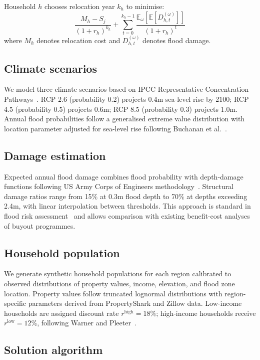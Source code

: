 \documentclass[11pt,letterpaper]{article}
\theoremstyle{definition}
\newcommand{\E}{\mathbb{E}}
\begin{document}
Household $h$ chooses relocation year $k_h$ to minimise:
\begin{equation}
\frac{M_h - S_j}{(1+r_h)^{k_h}} + \sum_{t=0}^{k_h-1} \frac{\E_\omega[\E[D_{h,t}^{(\omega)}]]}{(1+r_h)^t}
\end{equation}
where $M_h$ denotes relocation cost and $D_{h,t}^{(\omega)}$ denotes flood damage.

\subsection*{Climate scenarios}

We model three climate scenarios based on IPCC Representative Concentration Pathways~\cite{ipcc2019srocc}. RCP 2.6 (probability 0.2) projects 0.4m sea-level rise by 2100; RCP 4.5 (probability 0.5) projects 0.6m; RCP 8.5 (probability 0.3) projects 1.0m. Annual flood probabilities follow a generalised extreme value distribution with location parameter adjusted for sea-level rise following Buchanan et al.~\cite{buchanan2016allowances}.

\subsection*{Damage estimation}

Expected annual flood damage combines flood probability with depth-damage functions following US Army Corps of Engineers methodology~\cite{usace1992depth}. Structural damage ratios range from 15\% at 0.3m flood depth to 70\% at depths exceeding 2.4m, with linear interpolation between thresholds. This approach is standard in flood risk assessment~\cite{wing2018estimates} and allows comparison with existing benefit-cost analyses of buyout programmes.

\subsection*{Household population}

We generate synthetic household populations for each region calibrated to observed distributions of property values, income, elevation, and flood zone location. Property values follow truncated lognormal distributions with region-specific parameters derived from PropertyShark and Zillow data. Low-income households are assigned discount rate $r^{\text{high}} = 18\%$; high-income households receive $r^{\text{low}} = 12\%$, following Warner and Pleeter~\cite{warner2001personal}.

\subsection*{Solution algorithm}
\end{document}
